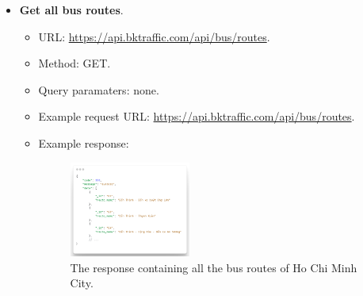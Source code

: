\begin{itemize}
    \newpage
    \item \textbf{Get all bus routes}.
    \begin{itemize}
        \item URL: \url{https://api.bktraffic.com/api/bus/routes}.
        \item Method: GET.
        \item Query paramaters: none.
        \item Example request URL: \url{https://api.bktraffic.com/api/bus/routes}.
        \item Example response:
        \begin{figure}[H]
            \centering
            \includegraphics[width=0.4\textwidth]{assets/images/Implementation/all_routes_response.png}
            \caption{The response containing all the bus routes of Ho Chi Minh City.}
            \label{fig:all_routes_response}
        \end{figure}
    \end{itemize}


\end{itemize}
